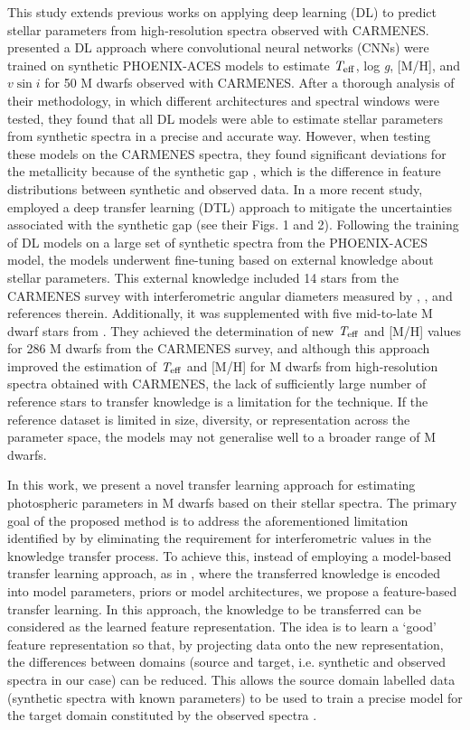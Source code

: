 This study extends previous works on applying deep learning (DL) to predict stellar parameters from high-resolution spectra observed with CARMENES.  presented a DL approach where convolutional neural networks (CNNs) were trained on synthetic PHOENIX-ACES models to estimate $\textit{T}_{\rm eff}$, log \textit{g}, [M/H], and $\textit{v}\sin{i}$ for 50 M dwarfs observed with CARMENES. After a thorough analysis of their methodology, in which different architectures and spectral windows were tested, they found that all DL models were able to estimate stellar parameters from synthetic spectra in a precise and accurate way. However, when testing these models on the CARMENES spectra, they found significant deviations for the metallicity because of the synthetic gap \citep{fabbro2018,Tabernero2022}, which is the difference in feature distributions between synthetic and observed data.
In a more recent study, \citet[][hereafter Bello23]{bello2023} employed a deep transfer learning (DTL) approach to mitigate the uncertainties associated with the synthetic gap (see their Figs. 1 and 2). Following the training of DL models on a large set of synthetic spectra from the PHOENIX-ACES model, the models underwent fine-tuning based on external knowledge about stellar parameters. This external knowledge included 14 stars from the CARMENES survey with interferometric angular diameters measured by \citet{Boyajian2012}, \citet{vonBraun2014}, and references therein. Additionally, it was supplemented with five mid-to-late M dwarf stars from \citet{passegger2022}. They achieved the determination of new $\textit{T}_{\rm eff}$ and [M/H] values for 286 M dwarfs from the CARMENES survey, and although this approach improved the estimation of $\textit{T}_{\rm eff}$ and [M/H] for M dwarfs from high-resolution spectra obtained with CARMENES, the lack of sufficiently large number of reference stars to transfer knowledge is a limitation for the technique. If the reference dataset is limited in size, diversity, or representation across the parameter space, the models may not generalise well to a broader range of M dwarfs.

In this work, we present a novel transfer learning approach for estimating photospheric parameters in M dwarfs based on their stellar spectra. The primary goal of the proposed method is to address the aforementioned limitation identified by  by eliminating the requirement for interferometric values in the knowledge transfer process.
To achieve this, instead of employing a model-based transfer learning approach, as in , where the transferred knowledge is encoded into model parameters, priors or model architectures, we propose a feature-based transfer learning. In this approach, the knowledge to be transferred can be considered as the learned feature representation. The idea is to learn a `good' feature representation so that, by projecting data onto the new representation, the differences between domains (source and target, i.e. synthetic and observed spectra in our case) can be reduced. This allows the source domain labelled data (synthetic spectra with known parameters) to be used to train a precise model for the target domain constituted by the observed spectra \citep{yang2020}.

